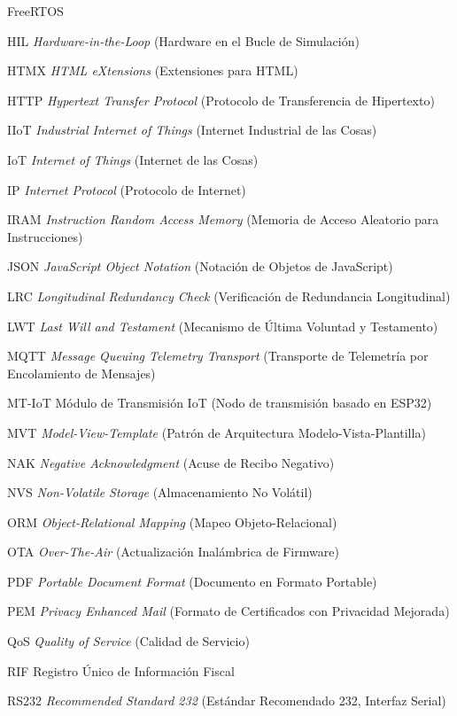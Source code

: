 \begin{acrolist}{FreeRTOS}
\item[HIL] \textit{Hardware-in-the-Loop} (Hardware en el Bucle de Simulación)
\item[HTMX] \textit{HTML eXtensions} (Extensiones para HTML)
\item[HTTP] \textit{Hypertext Transfer Protocol} (Protocolo de Transferencia de Hipertexto)
\item[IIoT] \textit{Industrial Internet of Things} (Internet Industrial de las Cosas)
\item[IoT] \textit{Internet of Things} (Internet de las Cosas)
\item[IP] \textit{Internet Protocol} (Protocolo de Internet)
\item[IRAM] \textit{Instruction Random Access Memory} (Memoria de Acceso Aleatorio para Instrucciones)
\item[JSON] \textit{JavaScript Object Notation} (Notación de Objetos de JavaScript)
\item[LRC] \textit{Longitudinal Redundancy Check} (Verificación de Redundancia Longitudinal)
\item[LWT] \textit{Last Will and Testament} (Mecanismo de Última Voluntad y Testamento)
\item[MQTT] \textit{Message Queuing Telemetry Transport} (Transporte de Telemetría por Encolamiento de Mensajes)
\item[MT-IoT] Módulo de Transmisión IoT (Nodo de transmisión basado en ESP32)
\item[MVT] \textit{Model-View-Template} (Patrón de Arquitectura Modelo-Vista-Plantilla)
\item[NAK] \textit{Negative Acknowledgment} (Acuse de Recibo Negativo)
\item[NVS] \textit{Non-Volatile Storage} (Almacenamiento No Volátil)
\item[ORM] \textit{Object-Relational Mapping} (Mapeo Objeto-Relacional)
\item[OTA] \textit{Over-The-Air} (Actualización Inalámbrica de Firmware)
\item[PDF] \textit{Portable Document Format} (Documento en Formato Portable)
\item[PEM] \textit{Privacy Enhanced Mail} (Formato de Certificados con Privacidad Mejorada)
\item[QoS] \textit{Quality of Service} (Calidad de Servicio)
\item[RIF] Registro Único de Información Fiscal
\item[RS232] \textit{Recommended Standard 232} (Estándar Recomendado 232, Interfaz Serial)

\end{acrolist}
